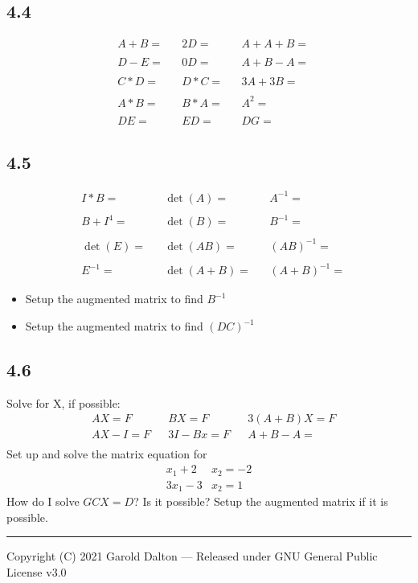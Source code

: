 \documentclass[14pt]{extarticle}
\begin{document}
\subsection*{4.4}
\begin{align*}
	&A+B= & &2D= & &A + A +B = \\\\
	&D-E= & &0D= & &A+B-A= \\\\
	&C*D= & &D*C= & &3A+3B= \\\\
	&A*B= & &B*A= & &A^2= \\\\
	&DE= & &ED= & &DG=
\end{align*}

\subsection*{4.5}
\begin{align*}
	&I*B= & &\det(A)= && A^{-1}= \\\\
	&B+I^4= & &\det(B)= && B^{-1}= \\\\
	&\det(E)= & &\det(AB)= && (AB)^{-1}= \\\\
	&E^{-1}= & &\det(A+B)= && (A+B)^{-1}= 
\end{align*}
\begin{itemize}
	\item Setup the augmented matrix to find $B^{-1}$
	\item Setup the augmented matrix to find $(DC)^{-1}$
\end{itemize}

\subsection*{4.6}
Solve for X, if possible:
\begin{align*}
	&AX=F & &BX=F & &3(A+B)X =F \\
	&AX-I=F & &3I - Bx=F & &A+B-A= \\
\end{align*}
Set up and solve the matrix equation for
\begin{align*}
	x_1 + 2&x_2 = -2 \\
	3x_1 - 3&x_2  = 1
\end{align*}
How do I solve $GCX = D$? Is it possible? Setup the augmented matrix if it is possible.

\noindent\rule{\textwidth}{1pt}
{\footnotesize Copyright (C) 2021 Garold Dalton --- Released under GNU General Public License v3.0}
\end{document}
